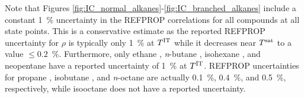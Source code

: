 \documentclass[preprint,letterpaper,floatfix,citeautoscript,aip,jcp]{revtex4-1}
\begin{document}

Note that Figures \ref{fig:IC_normal_alkanes}-\ref{fig:IC_branched_alkanes} include a constant 1~\% uncertainty in the REFPROP correlations for all compounds at all state points. This is a conservative estimate as the reported REFPROP uncertainty for $\rho$ is typically only 1~\% at $T^{\rm IT}$ while it decreases near $T^{\rm sat}$ to a value $\le 0.2$~\%. Furthermore, only ethane \cite{Ethane2006}, \textit{n}-butane \cite{Butane2006}, isohexane \cite{Lemmon2006}, and neopentane \cite{Lemmon2006} have a reported uncertainty of 1~\% at $T^{\rm IT}$. REFPROP uncertainties for propane \cite{Propane2009}, isobutane \cite{Butane2006}, and \textit{n}-octane \cite{Beckmueller2017} are actually 0.1~\%, 0.4~\%, and 0.5~\%, respectively, while isooctane \cite{Lemmon2006} does not have a reported uncertainty. 



\end{document}
